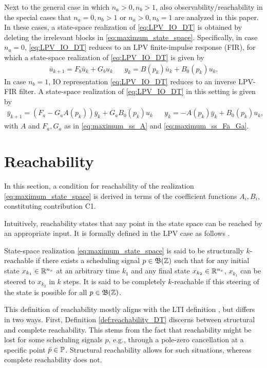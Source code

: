 Next to the general case in which $n_a>0,n_b>1$, also observability/reachability in the special cases that $n_a=0,n_b>1$ or $n_a>0,n_b=1$ are analyzed in this paper. In these cases, a state-space realization of \eqref{eq:LPV_IO_DT} is obtained by deleting the irrelevant blocks in \eqref{eq:maximum_state_space}. Specifically, in case $n_a=0$, \eqref{eq:LPV_IO_DT} reduces to an LPV finite-impulse response (FIR), for which a state-space realization of \eqref{eq:LPV_IO_DT} is given by
\begin{align} \label{eq:maximum_state_space_FIR}
    \bar{u}_{k+1} = F_b \bar{u}_k + G_b u_k  & & y_k = B(p_k) \bar{u}_k + B_0(p_k) u_k.
\end{align}
In case $n_b = 1$, IO representation \eqref{eq:LPV_IO_DT} reduces to an inverse LPV-FIR filter. A state-space realization of \eqref{eq:LPV_IO_DT} in this setting is given by
\begin{align} \label{eq:maximum_state_space_invFIR}
    \bar{y}_{k+1} = (F_a - G_a A(p_k)) \bar{y}_k + G_a B_0(p_k) u_k & & y_k = -A(p_k) \bar{y}_k + B_0(p_k) u_k,
\end{align}
with $A$ and $F_a,G_a$ as in \eqref{eq:maximum_ss_A} and \eqref{eq:maximum_ss_Fa_Ga}. 

\section{Reachability}
\label{sec:reachability}
In this section, a condition for reachability of the realization \eqref{eq:maximum_state_space} is derived in terms of the coefficient functions $A_i,B_i$, constituting contribution C1. 

Intuitively, reachability states that any point in the state space can be reached by an appropriate input. It is formally defined in the LPV case as follows \cite{Silverman1967, Gohberg1992, Toth2010}.

\begin{definition}
\label{def:reachability_DT}
    State-space realization \eqref{eq:maximum_state_space} is said to be structurally $k$-reachable if there exists a scheduling signal $p\in\mathfrak{B}(\mathbb{Z})$ such that for any initial state $x_{k_1} \in \mathbb{R}^{n_x}$ at an arbitrary time $k_1$ and any final state $x_{k_2}\in\mathbb{R}^{n_x}$, $x_{k_1}$ can be steered to $x_{k_2}$ in $k$ steps. It is said to be completely $k$-reachable if this steering of the state is possible for all $p\in\mathfrak{B}(\mathbb{Z})$.
\end{definition}
This definition of reachability mostly aligns with the LTI definition \cite[Section 6.1]{Chen1999}, but differs in two ways. First, Definition \ref{def:reachability_DT} discerns between structural and complete reachability. This stems from the fact that reachability might be lost for some scheduling signals $p$, e.g., through a pole-zero cancellation at a specific point $\bar{p}\in\mathbb{P}$. Structural reachability allows for such situations, whereas complete reachability does not. 

